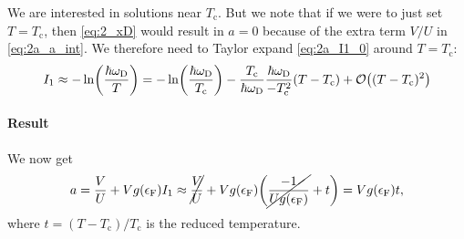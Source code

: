 \documentclass[11pt,letter, swedish, english
]{article}
\newcommand{\Tc}{\ensuremath{T_{\text{c}}}}
\newcommand{\eF}{\ensuremath{\epsilon_{\text{F}}}}
\newcommand{\wD}{\ensuremath{\omega_{\text{D}}}}
\begin{document}
We are interested in solutions near $\Tc$. But we note that if we were
to just set $T=\Tc$, then \eqref{eq:2_xD} would result in $a=0$
because of the extra term $V/U$ in \eqref{eq:2a_a_int}. We therefore
need to Taylor expand \eqref{eq:2a_I1_0} around $T=\Tc$:
\begin{equation}
I_1\approx-\ln(\frac{\hbar\wD}{T})
=-\ln(\frac{\hbar\wD}{\Tc}) -
\frac{\Tc}{\hbar\wD}\frac{\hbar\wD}{-\Tc^2} (T-\Tc)
+\order{(T-\Tc)^2}
\end{equation}



\paragraph{Result}
We now get
\begin{equation}\label{eq:2_a}
a=\frac{V}{U}+Vg(\eF)I_1
\approx\cancel{\frac{V}{U}}+
Vg(\eF)\qty(\cancel{\frac{-1}{Ug(\eF)}}+t)
=Vg(\eF)t,
\end{equation}
where $t=(T-\Tc)/\Tc$ is the reduced temperature.
\end{document}
